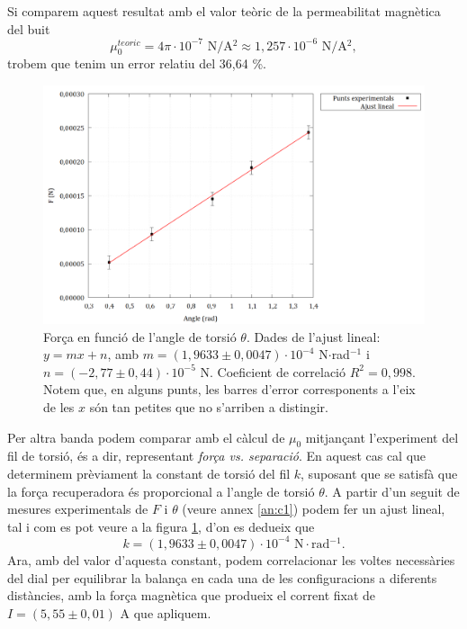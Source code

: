 \documentclass[a4paper,10.5pt]{report}
\begin{document}
Si comparem aquest resultat amb el valor teòric de la permeabilitat magnètica del buit
\begin{equation*}
	\mu_0^{teoric} = 4\pi\cdot 10^{-7} \text{ N/A$^2$} \approx 1,257\cdot10^{-6} \text{ N/A$^2$},
\end{equation*}
trobem que tenim un error relatiu del 36,64 \%.

\begin{figure}[H]
	\centering
	\includegraphics[width=0.8\linewidth]{screenshot017}
	\caption{Força en funció de l'angle de torsió $\theta$. Dades de l'ajust lineal: $y=mx+n$, amb $m=(1,9633\pm0,0047)\cdot10^{-4}$ N$\cdot$rad$^{-1}$ i $n=(-2,77\pm0,44)\cdot10^{-5}$ N. Coeficient de correlació $R^2=0,998$. Notem que, en alguns punts, les barres d'error corresponents a l'eix de les $x$ són tan petites que no s'arriben a distingir.}
	\label{fig:2.4}
\end{figure}

Per altra banda podem comparar amb el càlcul de $\mu_0$ mitjançant l'experiment del fil de torsió, és a dir, representant \textit{força vs. separació}. En aquest cas cal que determinem prèviament la constant de torsió del fil $k$, suposant que se satisfà que la força recuperadora és proporcional a l'angle de torsió $\theta$. A partir d'un seguit de mesures experimentals de $F$ i $\theta$ (veure annex \ref{an:c1}) podem fer un ajust lineal, tal i com es pot veure a la figura \ref{fig:2.4}, d'on es dedueix que
\begin{equation*}
	k = (1,9633\pm 0,0047)\cdot 10^{-4} \text{ N$\cdot$rad$^{-1}$}.
\end{equation*}
Ara, amb del valor d'aquesta constant, podem correlacionar les voltes necessàries del dial per equilibrar la balança en cada una de les configuracions a diferents distàncies, amb la força magnètica que produeix el corrent fixat de $I = (5,55 \pm 0,01)$ A que apliquem. 
\end{document}
